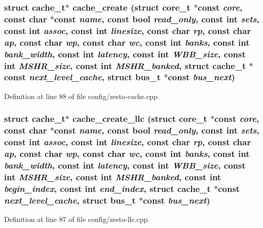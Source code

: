 \subsubsection[{cache\_\-create}]{\setlength{\rightskip}{0pt plus 5cm}struct {\bf cache\_\-t}$\ast$ cache\_\-create (struct {\bf core\_\-t} $\ast$const  {\em core}, \/  const char $\ast$const  {\em name}, \/  const bool {\em read\_\-only}, \/  const int {\em sets}, \/  const int {\em assoc}, \/  const int {\em linesize}, \/  const char {\em rp}, \/  const char {\em ap}, \/  const char {\em wp}, \/  const char {\em wc}, \/  const int {\em banks}, \/  const int {\em bank\_\-width}, \/  const int {\em latency}, \/  const int {\em WBB\_\-size}, \/  const int {\em MSHR\_\-size}, \/  const int {\em MSHR\_\-banked}, \/  struct {\bf cache\_\-t} $\ast$const  {\em next\_\-level\_\-cache}, \/  struct {\bf bus\_\-t} $\ast$const  {\em bus\_\-next})\hspace{0.3cm}{\tt  [read]}}\label{config_2zesto-cache_8h_f37d0719955363306947d707ca6a56f3}




Definition at line 88 of file config/zesto-cache.cpp.
\subsubsection[{cache\_\-create\_\-llc}]{\setlength{\rightskip}{0pt plus 5cm}struct {\bf cache\_\-t}$\ast$ cache\_\-create\_\-llc (struct {\bf core\_\-t} $\ast$const  {\em core}, \/  const char $\ast$const  {\em name}, \/  const bool {\em read\_\-only}, \/  const int {\em sets}, \/  const int {\em assoc}, \/  const int {\em linesize}, \/  const char {\em rp}, \/  const char {\em ap}, \/  const char {\em wp}, \/  const char {\em wc}, \/  const int {\em banks}, \/  const int {\em bank\_\-width}, \/  const int {\em latency}, \/  const int {\em WBB\_\-size}, \/  const int {\em MSHR\_\-size}, \/  const int {\em MSHR\_\-banked}, \/  const int {\em begin\_\-index}, \/  const int {\em end\_\-index}, \/  struct {\bf cache\_\-t} $\ast$const  {\em next\_\-level\_\-cache}, \/  struct {\bf bus\_\-t} $\ast$const  {\em bus\_\-next})\hspace{0.3cm}{\tt  [read]}}\label{config_2zesto-cache_8h_8e1bb5340056d589c19813cbc1ab6318}




Definition at line 87 of file config/zesto-llc.cpp.

